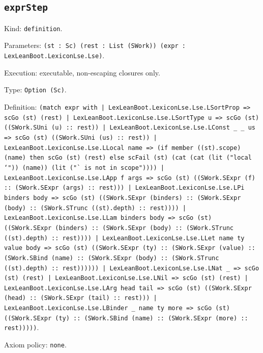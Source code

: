 \documentclass[11pt]{article}
\begin{document}
\subsection*{\texttt{exprStep}}
\noindent Kind: \texttt{definition}.\par
\noindent Parameters: \texttt{(st : Sc) (rest : List (SWork)) (expr : LexLeanBoot.LexiconLse.Lse)}.\par
\noindent Execution: executable, non-escaping closures only.\par
\noindent Type: \texttt{Option (Sc)}.\par
\noindent Definition: \texttt{(match expr with | LexLeanBoot.LexiconLse.Lse.LSortProp => scGo (st) (rest) | LexLeanBoot.LexiconLse.Lse.LSortType u => scGo (st) ((SWork.SUni (u) :: rest)) | LexLeanBoot.LexiconLse.Lse.LConst \_ \_ us => scGo (st) ((SWork.SUni (us) :: rest)) | LexLeanBoot.LexiconLse.Lse.LLocal name => (if member ((st).scope) (name) then scGo (st) (rest) else scFail (st) (cat (cat (lit ("local `")) (name)) (lit ("` is not in scope")))) | LexLeanBoot.LexiconLse.Lse.LApp f args => scGo (st) ((SWork.SExpr (f) :: (SWork.SExpr (args) :: rest))) | LexLeanBoot.LexiconLse.Lse.LPi binders body => scGo (st) ((SWork.SExpr (binders) :: (SWork.SExpr (body) :: (SWork.STrunc ((st).depth) :: rest)))) | LexLeanBoot.LexiconLse.Lse.LLam binders body => scGo (st) ((SWork.SExpr (binders) :: (SWork.SExpr (body) :: (SWork.STrunc ((st).depth) :: rest)))) | LexLeanBoot.LexiconLse.Lse.LLet name ty value body => scGo (st) ((SWork.SExpr (ty) :: (SWork.SExpr (value) :: (SWork.SBind (name) :: (SWork.SExpr (body) :: (SWork.STrunc ((st).depth) :: rest)))))) | LexLeanBoot.LexiconLse.Lse.LNat \_ => scGo (st) (rest) | LexLeanBoot.LexiconLse.Lse.LNil => scGo (st) (rest) | LexLeanBoot.LexiconLse.Lse.LArg head tail => scGo (st) ((SWork.SExpr (head) :: (SWork.SExpr (tail) :: rest))) | LexLeanBoot.LexiconLse.Lse.LBinder \_ name ty more => scGo (st) ((SWork.SExpr (ty) :: (SWork.SBind (name) :: (SWork.SExpr (more) :: rest)))))}.\par
\noindent Axiom policy: \texttt{none}.\par
\end{document}
